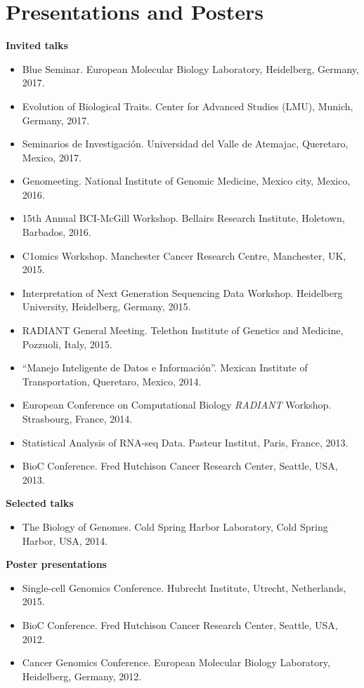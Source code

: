 \documentclass[11pt,a4paper,sans]{moderncv} %
\begin{document}
\section{Presentations and Posters}
\vspace{-.1cm}
\textbf{Invited talks}
\begin{itemize}
\item Blue Seminar. European Molecular Biology Laboratory, Heidelberg, Germany, 2017. 
\item Evolution of Biological Traits. Center for Advanced Studies (LMU), Munich, Germany, 2017.
\item Seminarios de Investigaci\'on. Universidad del Valle de Atemajac, Queretaro, Mexico, 2017.
\item Genomeeting. National Institute of Genomic Medicine, Mexico city, Mexico, 2016. 
\item 15th Annual BCI-McGill Workshop. Bellairs Research Institute, Holetown, Barbados, 2016.
\item C1omics Workshop. Manchester Cancer Research Centre, Manchester, UK, 2015.
\item Interpretation of Next Generation Sequencing Data Workshop. Heidelberg University, Heidelberg, Germany, 2015. 
\item RADIANT General Meeting. Telethon Institute of Genetics and Medicine, Pozzuoli, Italy, 2015.
\item ``Manejo Inteligente de Datos e Informaci\'on''. Mexican Institute of Transportation, Queretaro, Mexico, 2014.
\item European Conference on Computational Biology \emph{RADIANT} Workshop. Strasbourg, France, 2014.
\item Statistical Analysis of RNA-seq Data. Pasteur Institut, Paris, France, 2013.
\item BioC Conference. Fred Hutchison Cancer Research Center, Seattle, USA, 2013.
\end{itemize}
\vspace{.1cm}
\textbf{Selected talks}
\begin{itemize}
\item The Biology of Genomes. Cold Spring Harbor Laboratory, Cold Spring Harbor, USA, 2014. 
\end{itemize}
\vspace{.1cm}
\textbf{Poster presentations}
\begin{itemize}
\item Single-cell Genomics Conference. Hubrecht Institute, Utrecht, Netherlands, 2015.
\item BioC Conference. Fred Hutchison Cancer Research Center, Seattle, USA, 2012.
\item Cancer Genomics Conference. European Molecular Biology Laboratory, Heidelberg, Germany, 2012.
\end{itemize}
\end{document}

